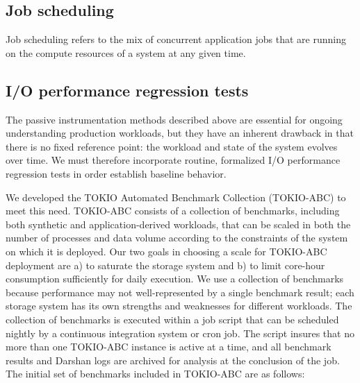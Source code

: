 \subsection{Job scheduling }

Job scheduling refers to the mix of concurrent application jobs that are
running on the compute resources of a system at any given time.

\subsection{I/O performance regression tests} \label{sec:methods/tests}

The passive instrumentation methods described above are essential for
ongoing understanding production workloads, but they have an inherent
drawback in that there is no fixed reference point: the workload
and state of the system evolves over time.  We must therefore incorporate
routine, formalized I/O performance regression tests in order establish baseline behavior.

We developed the TOKIO Automated Benchmark Collection (TOKIO-ABC) to meet
this need.  TOKIO-ABC consists of a collection of benchmarks, including
both synthetic and application-derived workloads, that can be scaled in
both the number of processes and data volume according to the constraints
of the system on which it is deployed. Our two goals in choosing a scale
for TOKIO-ABC deployment are a) to saturate the storage system and b)
to limit core-hour consumption sufficiently for daily execution.  We use
a collection of benchmarks because performance may not well-represented
by a single benchmark result; each storage system has its own strengths
and weaknesses for different workloads.  The collection of benchmarks is
executed within a job script that can be scheduled nightly by a continuous
integration system or cron job.  The script insures that no more than
one TOKIO-ABC instance is active at a time, and all benchmark results
and Darshan logs are archived for analysis at the conclusion of the job.
The initial set of benchmarks included in TOKIO-ABC are as follows:

